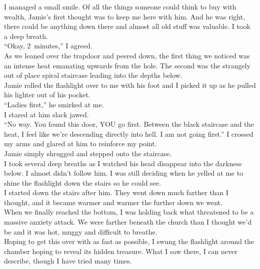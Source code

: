 \documentclass[a5paper]{scrartcl}
\begin{document}
I managed a small smile. Of all the things someone could think to buy with wealth, Jamie's first thought was to keep me here with him. And he was right, there could be anything down there and almost all old stuff was valuable. I took a deep breath.\\


\enquote{Okay, 2~minutes,} I agreed.\\


As we leaned over the trapdoor and peered down, the first thing we noticed was an intense heat emanating upwards from the hole. The second was the strangely out of place spiral staircase leading into the depths below. \\


Jamie rolled the flashlight over to me with his foot and I picked it up as he pulled his lighter out of his pocket.\\


\enquote{Ladies first,} he smirked at me.\\


I stared at him slack jawed. \\


\enquote{No way. You found this door, YOU go first. Between the black staircase and the heat, I feel like we're descending directly into hell. I am not going first.} I crossed my arms and glared at him to reinforce my point. \\


Jamie simply shrugged and stepped onto the staircase. \\


I took several deep breaths as I watched his head disappear into the darkness below. I almost didn't follow him. I was still deciding when he yelled at me to shine the flashlight down the stairs so he could see. \\


I started down the stairs after him. They went down much farther than I thought, and it became warmer and warmer the further down we went. \\


When we finally reached the bottom, I was holding back what threatened to be a massive anxiety attack. We were farther beneath the church than I thought we'd be and it was hot, muggy and difficult to breathe. \\


Hoping to get this over with as fast as possible, I swung the flashlight around the chamber hoping to reveal its hidden treasure. What I saw there, I can never describe, though I have tried many times. \\
\end{document}
